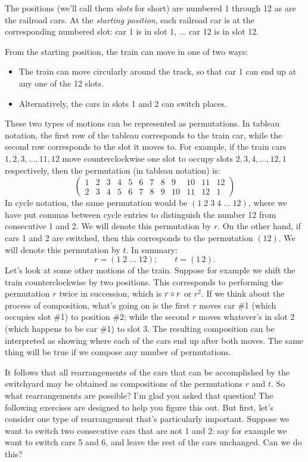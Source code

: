 The positions (we'll call them \emph{slots} for short)  are numbered 1 through 12 as are the railroad cars. At the \emph{starting position}, each railroad car is at the corresponding numbered slot: car 1 is in slot 1, $\ldots$ car 12 is in slot 12.

From the starting position, the train can move in one of two ways:
\begin{itemize}
\item
The train can move circularly around the track, so that car 1 can end up at any one of the 12 slots. 
\item
Alternatively, the cars in slots 1 and 2 can switch places. 
\end{itemize}
These two types of motions can be represented as permutations. In tableau notation, the first row of the tableau corresponds to the train car, while the second row corresponds to the slot it moves to. For example, if the train cars $1,2,3, \ldots ,11, 12$ move counterclockwise one slot to occupy slots $2,3,4,\ldots ,12,1$ respectively, then the permutation (in tableau notation) is:
\[ \left( \begin{array}{cccccccccccc}
1 & 2 & 3 & 4 & 5 & 6 & 7 & 8 & 9 & 10 & 11 & 12 \\
2 & 3 & 4 & 5 & 6 & 7 & 8 & 9 & 10 & 11 & 12 & 1
 \end{array} \right)\] 
In cycle notation,  the same permutation would be $(1 \; 2 \; 3 \; 4 \; \ldots \; 12)$, where we have put commas between cycle entries to distinguish the number 12 from consecutive 1 and 2.  We will denote this permutation by $r$. On the other hand, if cars 1 and 2 are switched, then this corresponds to the permutation $(1 2)$. We will denote this permutation by $t$.  In summary:
\[ r = (1 \; 2 \; \ldots \; 12);\qquad  t = (1 \, 2).\]
Let's look at some other motions of the train. Suppose for example we shift the train counterclockwise by two positions. This corresponds to performing the permutation $r$ twice in succession, which is $r \circ r$ or $r^2$.   If we think about the process of composition, what's going on is the first $r$ moves car \#1 (which occupies slot \#1) to position \#2; while the second $r$ moves whatever's in slot 2 (which happens to be car \#1) to slot 3. The resulting composition can be interpreted as showing where each of the cars end up after both moves.  The same thing will be true  if we compose any number of permutations. 

It follows that all rearrangements of the cars that can be accomplished by the switchyard may be obtained as compositions of the permutations $r$ and $t$. So what rearrangements are possible? I'm glad you asked that question! The following exercises are designed to help you figure this out. But first, let's consider one type of rearrangement that's particularly important. Suppose we want to switch two consecutive cars that are not 1 and 2: say for example we want to switch cars 5 and 6, and leave the rest of the cars unchanged.  Can we do this? 

